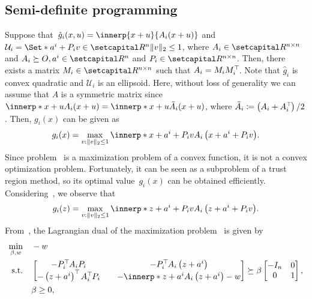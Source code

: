 \documentclass[../../main]{subfiles}
\begin{document}
\subsection{Semi-definite programming} 
Suppose that~$\hat{g}_i (x,u) = \innerp{x + u}{A_i (x + u)}$ and ${\mathcal{U}}_i = \Set*{ a^i + P_i v \in \setR^n }{\norm{v}_2 \leq 1 }$, where $A_i \in \setR^{n \times n}$ and $A_i \succeq O, a^i \in \setR^n$ and $P_i \in \setR^{n \times n}$.
Then, there exists a matrix $M_i \in \setR^{n \times n}$ such that $A_i = M_i M_i^\top\hspace{-1pt}$.
Note that $\hat{g}_i$ is convex quadratic and $\mathcal{U}_i$ is an ellipsoid.
Here, without loss of generality we can assume that $A$ is a symmetric matrix since $\innerp*{x + u}{A_i (x + u)} = \innerp*{x + u}{\tilde{A}_i (x + u)}$, where $\tilde{A}_i \coloneqq \left(A_i+A_i^\top\hspace{-1pt}\right) / 2$. Then, $g_i(x)$ can be given as
\begin{equation} \label{eq:sdp_g_i}
    g_i(x) = \max_{v : \norm{v}_2 \leq 1} \innerp*{x + a^i + P_i v}{A_i \left(x + a^i + P_i v\right)}.
\end{equation}
Since problem~ is a maximization problem of a convex function, it is not a convex optimization problem. Fortunately, it can be seen as a subproblem of a trust region method, so its optimal value~$g_i(x)$ can be obtained efficiently. Considering~, we observe that
\begin{equation} \label{eq:sdp_g_i_}
    g_i(z) = \max_{v : \norm{v}_2 \leq 1} \innerp*{z + a^i + P_i v}{A_i \left(z + a^i + P_i v\right)}.
\end{equation}
From~\cite[Section~3]{Beck2006}, the Lagrangian dual of the maximization problem~ is given by
\begin{equation}\label{eq:dual}
    \begin{aligned}
        \min_{\beta, w} \quad & -w            \\
        \st    \quad          &
        \begin{bmatrix}
            -P_i^\T A_i P_i                     & \quad -P_i^\T A_i \left(z + a^i\right)                 \\
            -\left(z + a^i\right)^\T A_i^\T P_i & \quad -\innerp*{z + a^i}{A_i \left(z + a^i\right)} - w
        \end{bmatrix}
        \succeq
        \beta \begin{bmatrix}
                  -I_n & 0 \\
                  0    & 1
              \end{bmatrix},                  \\
                              & \beta \geq 0,
    \end{aligned}
\end{equation}
\end{document}
